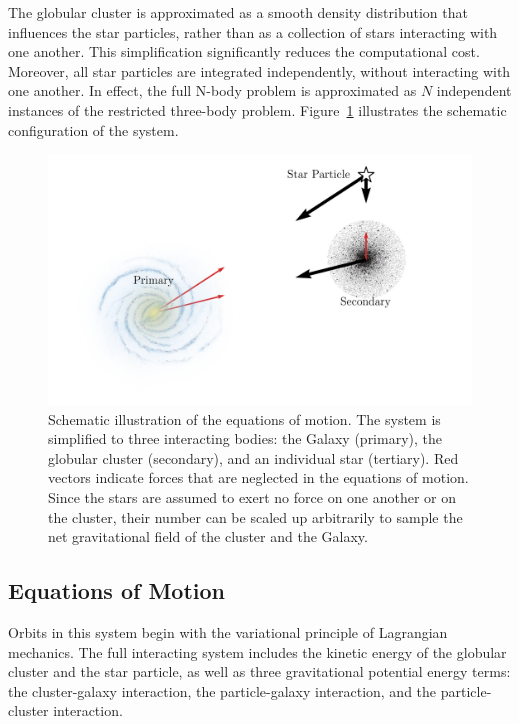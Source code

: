     The globular cluster is approximated as a smooth density distribution that influences the star particles, rather than as a collection of stars interacting with one another. This simplification significantly reduces the computational cost. Moreover, all star particles are integrated independently, without interacting with one another. In effect, the full N-body problem is approximated as \(N\) independent instances of the restricted three-body problem.  Figure~\ref{fig:restricted_three_body_set_up} illustrates the schematic configuration of the system.
    \begin{figure}
        \centering
        \includegraphics[width=\linewidth]{images/restricted_three_body_set_up.png}
        \caption{Schematic illustration of the equations of motion. The system is simplified to three interacting bodies: the Galaxy (primary), the globular cluster (secondary), and an individual star (tertiary). Red vectors indicate forces that are neglected in the equations of motion. Since the stars are assumed to exert no force on one another or on the cluster, their number can be scaled up arbitrarily to sample the net gravitational field of the cluster and the Galaxy.}
        \label{fig:restricted_three_body_set_up}
    \end{figure}
    
    \subsection{Equations of Motion} \label{subsec:myEquationsOfMotion}
        Orbits in this system begin with the variational principle of Lagrangian mechanics. The full interacting system includes the kinetic energy of the globular cluster and the star particle, as well as three gravitational potential energy terms: the cluster-galaxy interaction, the particle-galaxy interaction, and the particle-cluster interaction.

